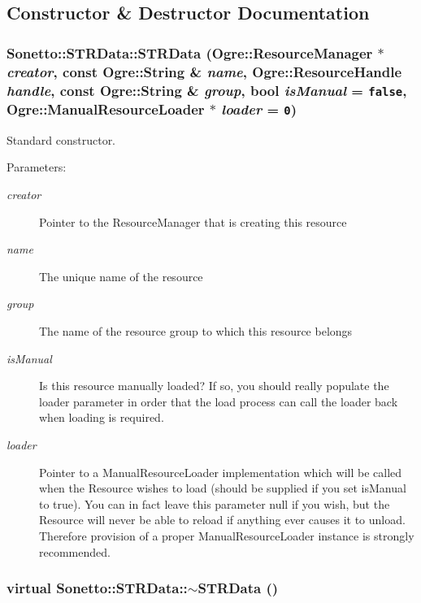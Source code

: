 \subsection{Constructor \& Destructor Documentation}
\subsubsection{\setlength{\rightskip}{0pt plus 5cm}Sonetto::STRData::STRData (Ogre::ResourceManager $\ast$ {\em creator}, const Ogre::String \& {\em name}, Ogre::ResourceHandle {\em handle}, const Ogre::String \& {\em group}, bool {\em isManual} = {\tt false}, Ogre::ManualResourceLoader $\ast$ {\em loader} = {\tt 0})}\label{class_sonetto_1_1_s_t_r_data_0282365c8e4439a79c3def01f81f2e80}


Standard constructor. \begin{Desc}
\item[Parameters:]
\begin{description}
\item[{\em creator}]Pointer to the ResourceManager that is creating this resource \item[{\em name}]The unique name of the resource \item[{\em group}]The name of the resource group to which this resource belongs \item[{\em isManual}]Is this resource manually loaded? If so, you should really populate the loader parameter in order that the load process can call the loader back when loading is required. \item[{\em loader}]Pointer to a ManualResourceLoader implementation which will be called when the Resource wishes to load (should be supplied if you set isManual to true). You can in fact leave this parameter null if you wish, but the Resource will never be able to reload if anything ever causes it to unload. Therefore provision of a proper ManualResourceLoader instance is strongly recommended. \end{description}
\end{Desc}
\subsubsection{\setlength{\rightskip}{0pt plus 5cm}virtual Sonetto::STRData::$\sim$STRData ()\hspace{0.3cm}{\tt  [virtual]}}\label{class_sonetto_1_1_s_t_r_data_e85c5d00b20565485fe8964c02345270}


